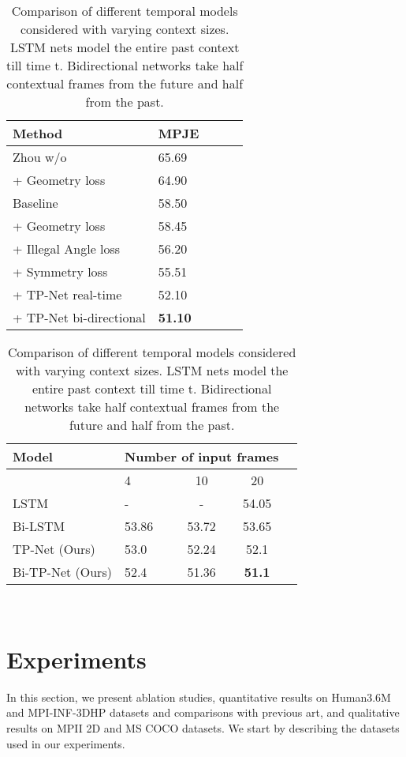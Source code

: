 \documentclass[runningheads]{llncs}
\begin{document}
	 
\begin{table}[!bht]
\centering
\footnotesize
\parbox{.40\linewidth}{

\begin{tabular}{ l  l  c  c c  }
{\bf Method} & {\bf MPJE}\\
\hline
Zhou w/o ~\cite{Zhou_2017_ICCV}& 65.69\\
 + Geometry loss & 64.90\\
\hline
Baseline & 58.50\\
 + Geometry loss & 58.45\\ 
 + Illegal Angle loss & 56.20\\
 + Symmetry loss & 55.51\\
 + TP-Net real-time & 52.10\\
 + TP-Net bi-directional & \textbf{51.10}\\
\hline
\end{tabular} 
\vskip 2mm
\caption{Ablation of different loss terms on Human3.6M using Protocol 1.}
\label{tab:ablation}
}
\hspace{1em}
\parbox{.45\linewidth}{

  \begin{tabular}{l  l  c  c c  }
     {\bf Model} &
      \multicolumn{3}{c}{\bf Number of input frames} \\
      \hline
      & 4 & 10 & 20\\
    \hline
    LSTM & - & - & 54.05 \\
    Bi-LSTM & 53.86 & 53.72 & 53.65 \\
    TP-Net (Ours) & 53.0 & 52.24 & 52.1 \\
    Bi-TP-Net (Ours) & 52.4 & 51.36 & \textbf{51.1} \\
    \hline
  \end{tabular}
\vskip 2mm
\caption{Comparison of different temporal models considered with varying context sizes. LSTM nets model the entire past context till time t. Bidirectional networks take half contextual frames from the future and half from the past.}
\label{tab:lstmComp}
}\\
\end{table}



\section{Experiments} \label{experiments}
In this section, we present ablation studies, quantitative results on Human3.6M and MPI-INF-3DHP datasets and comparisons with previous art, and qualitative results on MPII 2D and MS COCO datasets. We start by describing the datasets used in our experiments.
\end{document}
